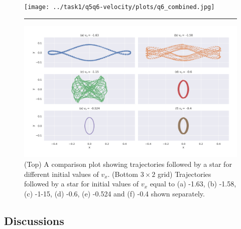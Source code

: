 \documentclass[a4paper]{article}
\begin{document}
\begin{itemize}
			\begin{figure} [h]
				\texttt{[image: ../task1/q5q6-velocity/plots/q6\_combined.jpg]}
				\hrule
				\includegraphics[width=\columnwidth]{../task1/q5q6-velocity/plots/q6_sep.jpg}
				\caption{(Top) A comparison plot showing trajectories followed by a star for different initial values of \(v_x\). (Bottom \(3 \times 2\) grid) Trajectories followed by a star for initial values of \(v_x\) equal to (a) -1.63, (b) -1.58, (c) -1-15, (d) -0.6, (e) -0.524 and (f) -0.4 shown separately.}
				\label{fig:task1.6}
			\end{figure}
		\end{itemize}
		
	
		
		\subsection{Discussions} \label{discussions1}
		
\end{document}
